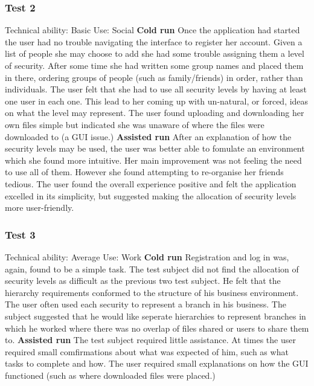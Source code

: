 \documentclass[12pt, titlepage]{article}
\begin{document}
\subsubsection{Test 2}
Technical ability: Basic
\newline Use: Social
\newline
\newline \textbf{Cold run}
\newline Once the application had started the user had no trouble navigating the interface to register her account. Given a list of people she may choose to add she had some trouble assigning them a level of security. After some time she had written some group names and placed them in there, ordering groups of people (such as family/friends) in order, rather than individuals. The user felt that she had to use all security levels by having at least one user in each one. This lead to her coming up with un-natural, or forced, ideas on what the level may represent.
\newline \indent The user found uploading and downloading her own files simple but indicated she was unaware of where the files were downloaded to (a GUI issue.)
\newline
\newline \textbf{Assisted run}
\newline After an explanation of how the security levels may be used, the user was better able to fomulate an environment which she found more intuitive. Her main improvement was not feeling the need to use all of them. However she found attempting to re-organise her friends tedious.
\newline
\newline The user found the overall experience positive and felt the application excelled in its simplicity, but suggested making the allocation of security levels more user-friendly.

\subsubsection{Test 3}
Technical ability: Average
\newline Use: Work
\newline
\newline \textbf{Cold run}
\newline Registration and log in was, again, found to be a simple task. The test subject did not find the allocation of security levels as difficult as the previous two test subject. He felt that the hierarchy requirements conformed to the structure of his business environment. The user often used each security to represent a branch in his business. The subject suggested that he would like seperate hierarchies to represent branches in which he worked where there was no overlap of files shared or users to share them to.
\newline \textbf{Assisted run}
The test subject required little assistance. At times the user required small comfirmations about what was expected of him, such as what tasks to complete and how. The user required small explanations on how the GUI functioned (such as where downloaded files were placed.) 
\end{document}
